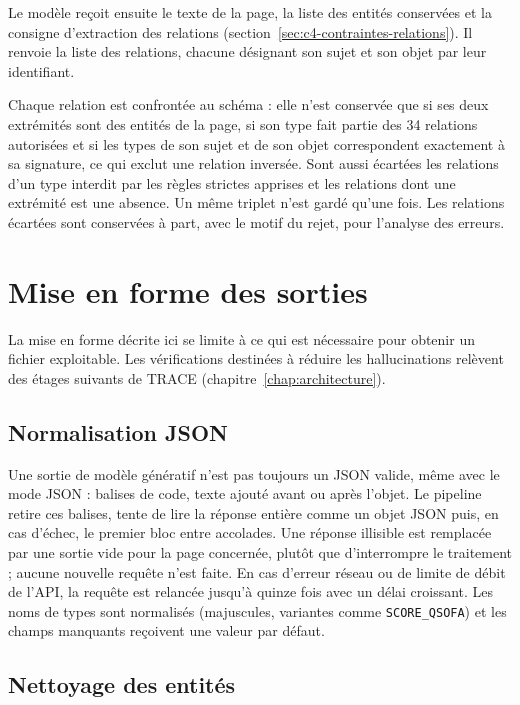Le modèle reçoit ensuite le texte de la page, la liste des entités conservées et la consigne d'extraction des relations (section~\ref{sec:c4-contraintes-relations}). Il renvoie la liste des relations, chacune désignant son sujet et son objet par leur identifiant.

Chaque relation est confrontée au schéma : elle n'est conservée que si ses deux extrémités sont des entités de la page, si son type fait partie des 34 relations autorisées et si les types de son sujet et de son objet correspondent exactement à sa signature, ce qui exclut une relation inversée. Sont aussi écartées les relations d'un type interdit par les règles strictes apprises et les relations dont une extrémité est une absence. Un même triplet n'est gardé qu'une fois. Les relations écartées sont conservées à part, avec le motif du rejet, pour l'analyse des erreurs.

\section{Mise en forme des sorties}\label{sec:c4-postproc}

La mise en forme décrite ici se limite à ce qui est nécessaire pour obtenir un fichier exploitable. Les vérifications destinées à réduire les hallucinations relèvent des étages suivants de TRACE (chapitre~\ref{chap:architecture}).

\subsection{Normalisation JSON}\label{sec:c4-norm-json}

Une sortie de modèle génératif n'est pas toujours un JSON valide, même avec le mode JSON : balises de code, texte ajouté avant ou après l'objet. Le pipeline retire ces balises, tente de lire la réponse entière comme un objet JSON puis, en cas d'échec, le premier bloc entre accolades. Une réponse illisible est remplacée par une sortie vide pour la page concernée, plutôt que d'interrompre le traitement ; aucune nouvelle requête n'est faite. En cas d'erreur réseau ou de limite de débit de l'API, la requête est relancée jusqu'à quinze fois avec un délai croissant. Les noms de types sont normalisés (majuscules, variantes comme \texttt{SCORE\_QSOFA}) et les champs manquants reçoivent une valeur par défaut.

\subsection{Nettoyage des entités}\label{sec:c4-nettoyage-entites}

